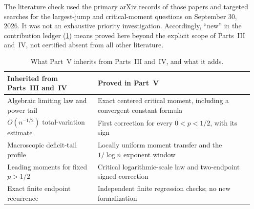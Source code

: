 \documentclass[11pt,a4paper]{article}
\theoremstyle{definition}\newaliascnt{definition}{theorem}
\theoremstyle{remark}\newaliascnt{remark}{theorem}
\begin{document}
The literature check used the primary arXiv records of those papers and
targeted searches for the largest-jump and critical-moment questions on
September 30, 2026. It was not an exhaustive priority investigation.
Accordingly, ``new'' in the contribution ledger (\cref{cjm:tab:ledger})
means proved here beyond the explicit scope of Parts~III and~IV, not
certified absent from all other literature.

\begin{table}[htbp]
\centering\small
\caption{What Part~V inherits from Parts~III and~IV, and what it adds.}
\label{cjm:tab:ledger}
\begin{tabular}{p{.40\linewidth}p{.52\linewidth}}
\toprule
Inherited from Parts~III and~IV & Proved in Part~V\\
\midrule
Algebraic limiting law and power tail & Exact centered critical moment, including a convergent constant formula\\
$O(n^{-1/2})$ total-variation estimate & First correction for every $0<p<1/2$, with its sign\\
Macroscopic deficit-tail profile & Locally uniform moment transfer and the $1/\log n$ exponent window\\
Leading moments for fixed $p>1/2$ & Critical logarithmic-scale law and two-endpoint signed correction\\
Exact finite endpoint recurrence & Independent finite regression checks; no new formalization\\
\bottomrule
\end{tabular}
\end{table}
\end{document}
